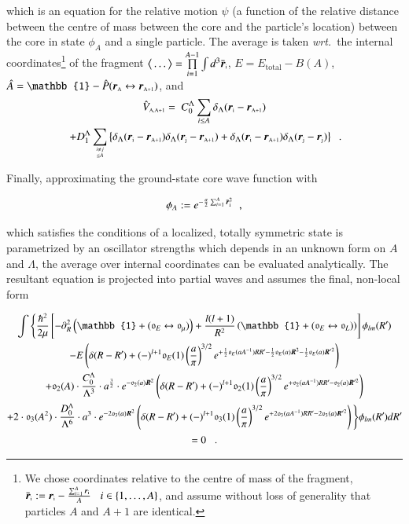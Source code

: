 \documentclass[preprint,12pt]{elsarticle}
\newcommand*{\mprime}{^{\prime}\mkern-1.2mu}
\newcommand{\wrt}{\textit{wrt.}~}
\newcommand{\ve}[1]{\ensuremath{\boldsymbol{#1}}}
\newcommand{\be}{\begin{equation}}
\newcommand{\ee}{\end{equation}}
\newcommand{\bra}{\big\langle}
\newcommand{\ket}{\big\rangle}
\newcommand{\vcl}[1]{\ensuremath{\bar{\boldsymbol{r}}_\text{\tiny #1}}}
\newcommand{\vsp}[1]{\ensuremath{\boldsymbol{r}}_\text{\tiny #1}}
\newcommand{\la}{\label}
\begin{document}
which is an equation for the relative motion $\psi$ (a function of the relative distance between the centre of mass
between the core and the particle's location) between the core in state $\phi_A$ and a single particle.
The average is taken \wrt the internal coordinates\footnote{We chose coordinates relative to the centre of mass of
the fragment, \mbox{$\vcl{i}:=\vsp{i}-\frac{\scriptstyle \sum_{i=1}^A\vsp{i}}{A}\;\;\;i\in\lbrace 1,\ldots,A\rbrace$},
and assume without loss of generality that particles $A$ and $A+1$ are identical.}
of the fragment \mbox{$\bra\ldots\ket=\prod\limits_{i=1}^{A-1}\int d^3\vcl{i}$}, \mbox{$E=E_\text{total}-B(A)$},
\mbox{$\hat{A}=\mathbb{1}-\hat{P}(\vsp{A}\leftrightarrow\vsp{A+1})$}, and
\begin{gather}
\hat{V}_\text{\tiny A,A+1}=~C_0^\Lambda\sum\limits_{i\leq A}\delta_\Lambda(\vsp{i}-\vsp{A+1})\nonumber\\
~+D_1^\Lambda\sum\limits_{i\neq j\atop \leq A}\left\lbrace\delta_\Lambda(\vsp{i}-\vsp{A+1})\delta_\Lambda(\vsp{j}-\vsp{A+1})
+\delta_\Lambda(\vsp{i}-\vsp{A+1})\delta_\Lambda(\vsp{j}-\vsp{j})\right\rbrace\;\;.
\end{gather}

Finally, approximating the ground-state core wave function with

\be\la{eq:corewf}
\phi_A:=e^{-\frac{a}{2}\sum_{i=1}^{A}\vcl{i}^2}\;\;,
\ee

which satisfies the conditions of a localized, totally symmetric state is parametrized by an
oscillator strengths which depends in an unknown form on $A$ and $\Lambda$, the average over internal coordinates
can be evaluated analytically. The resultant equation is projected into partial waves and
assumes the final, non-local form

\begin{subequations}\la{eq.rgm.pw}
\begin{gather}
\int\Bigg\lbrace\frac{\hbar^2}{2\mu}\left[-\partial^2_R\left(\mathbb{1}+(\mathfrak{o}_E\leftrightarrow\mathfrak{o}_\mu)\right)+
\frac{l(l+1)}{R^2}\left(\mathbb{1}+(\mathfrak{o}_E\leftrightarrow\mathfrak{o}_L)\right)\right]
\phi_{lm}(R\mprime)\la{eq.rgm.pw.a}\\
%
-E\left(\delta(R-R\mprime)+(-)^{l+1}\mathfrak{o}_E(1)\left(\frac{a}{\pi}\right)^{3/2}
e^{+\frac{1}{2}\mathfrak{o}_E(aA^{-1})RR\mprime-\frac{1}{2}\mathfrak{o}_E(a)\ve{R}^2-\frac{1}{2}\mathfrak{o}_E(a)\ve{R}'^2}\right)\la{eq.rgm.pw.b}\\
%
+\mathfrak{o}_2(A)\cdot\frac{C_0^\Lambda}{\Lambda^3}\cdot a^{\frac{3}{2}}\cdot
e^{-\mathfrak{o}_2(a)\ve{R}^2}
\left(\delta(R-R\mprime)+(-)^{l+1}\mathfrak{o}_2(1)\left(\frac{a}{\pi}\right)^{3/2}
e^{+\mathfrak{o}_2(aA^{-1})RR\mprime-\mathfrak{o}_2(a)\ve{R}'^2}\right)\la{eq.rgm.pw.c}\\
%
+2\cdot\mathfrak{o}_3(A^2)\cdot\frac{D_0^\Lambda}{\Lambda^6}\cdot a^{3}\cdot
e^{-2\mathfrak{o}_3(a)\ve{R}^2}
\left(\delta(R-R\mprime)+(-)^{l+1}\mathfrak{o}_3(1)\left(\frac{a}{\pi}\right)^{3/2}
e^{+2\mathfrak{o}_3(aA^{-1})RR\mprime-2\mathfrak{o}_3(a)\ve{R}'^2}\right)
\Bigg\rbrace\phi_{lm}(R\mprime)dR\mprime\la{eq.rgm.pw.d}\\
 =0\;\;\;.\nonumber
\end{gather}
\end{subequations}
\end{document}
